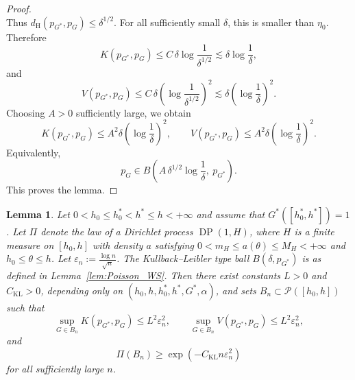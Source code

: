 \documentclass[twoside,12pt]{article}
\newtheorem{lem}[thm]{Lemma}
\begin{document}
\begin{proof}
\begin{displaymath}
\end{displaymath}
Thus $d_{\mathrm H}(p_{G^\ast},p_G)\le\delta^{1/2}$. For all sufficiently small $\delta$, this is smaller than $\eta_0$. Therefore
\begin{displaymath}
K(p_{G^\ast},p_G)\le C\,\delta\log\frac{1}{\delta^{1/2}}\lesssim\delta\log\frac{1}{\delta},
\end{displaymath}
and
\begin{displaymath}
V(p_{G^\ast},p_G)\le C\,\delta\left(\log\frac{1}{\delta^{1/2}}\right)^2\lesssim\delta\left(\log\frac{1}{\delta}\right)^2.
\end{displaymath}
Choosing $A>0$ sufficiently large, we obtain
\begin{displaymath}
K(p_{G^\ast},p_G)\le A^2\delta\left(\log\frac{1}{\delta}\right)^2,\qquad V(p_{G^\ast},p_G)\le A^2\delta\left(\log\frac{1}{\delta}\right)^2.
\end{displaymath}
Equivalently,
\begin{displaymath}
p_G\in B\!\left(A\,\delta^{1/2}\log\frac{1}{\delta},\ p_{G^\ast}\right).
\end{displaymath}
This proves the lemma.
\end{proof}

\begin{lem}\label{lem:Poisson_local_sets}
Let $0<h_0\le h_0^\ast<h^\ast\le h<+\infty$ and assume that $G^\ast([h_0^\ast,h^\ast])=1$. Let $\Pi$ denote the law of a Dirichlet process $\operatorname{DP}(1,H)$, where $H$ is a finite measure on $[h_0,h]$ with density $a$ satisfying $0<m_H\le a(\theta)\le M_H<+\infty$ and $h_0\le \theta\le h$. Let $\varepsilon_n:=\frac{\log n}{\sqrt n}$. The Kullback--Leibler type ball $B(\delta,p_{G^\ast})$ is as defined in Lemma~\ref{lem:Poisson_WS}. Then there exist constants $L>0$ and $C_{\mathrm{KL}}>0$, depending only on $(h_0,h,h_0^\ast,h^\ast,G^\ast,\alpha)$, and sets $B_n\subset\mathcal P([h_0,h])$ such that
\begin{displaymath}
\sup_{G\in B_n}K(p_{G^\ast},p_G)\le L^2\varepsilon_n^2,\qquad\sup_{G\in B_n}V(p_{G^\ast},p_G)\le L^2\varepsilon_n^2,
\end{displaymath}
and
\begin{displaymath}
\Pi(B_n)\ge \exp(-C_{\mathrm{KL}}n\varepsilon_n^2)
\end{displaymath}
for all sufficiently large $n$.
\end{lem}
\end{document}
